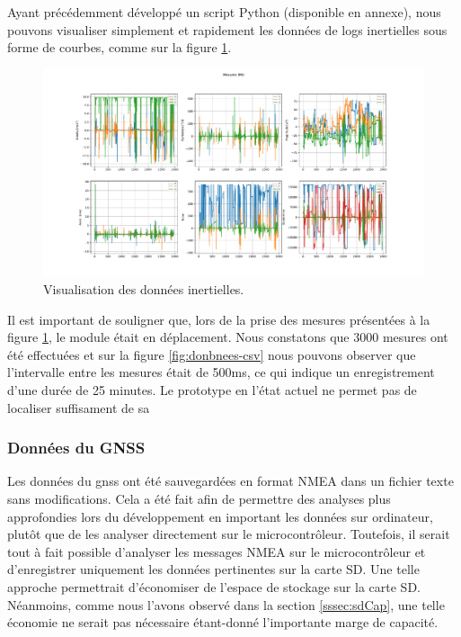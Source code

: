 Ayant précédemment développé un script Python (disponible en annexe), nous pouvons visualiser simplement et rapidement les données de logs inertielles sous forme de courbes, comme sur la figure \ref{fig:mesures}.

\begin{figure}[h]
	\centering
	\includegraphics[width=1\linewidth]{../figures/application/mesures}
	\caption{Visualisation des données inertielles.}
	\label{fig:mesures}
\end{figure}

Il est important de souligner que, lors de la prise des mesures présentées à la figure \ref{fig:mesures}, le module était en déplacement. Nous constatons que 3000 mesures ont été effectuées et sur la figure \ref{fig:donbnees-csv} nous pouvons observer que l'intervalle entre les mesures était de 500ms, ce qui indique un enregistrement d'une durée de 25 minutes. Le prototype en l'état actuel ne permet pas de localiser suffisament de sa

\subsubsection{Données du GNSS} \label{sssec:GNSS-data}

Les données du \gls{gnss} ont été sauvegardées en format NMEA dans un fichier texte sans modifications. Cela a été fait afin de permettre des analyses plus approfondies lors du développement en important les données sur ordinateur, plutôt que de les analyser directement sur le microcontrôleur. Toutefois, il serait tout à fait possible d'analyser les messages NMEA sur le microcontrôleur et d'enregistrer uniquement les données pertinentes sur la carte SD. Une telle approche permettrait d'économiser de l'espace de stockage sur la carte SD. Néanmoins, comme nous l'avons observé dans la section \ref{sssec:sdCap}, une telle économie ne serait pas nécessaire étant-donné l'importante marge de capacité. 

